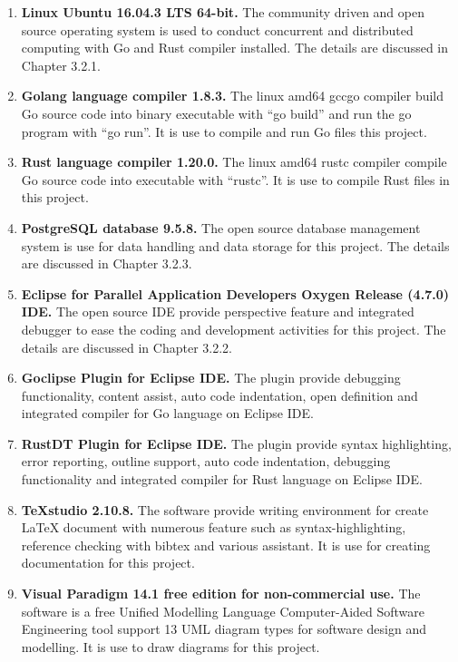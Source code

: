 \begin{enumerate}[topsep=0pt,itemsep=-1ex,partopsep=1ex,parsep=1.5ex]

\item \textbf{Linux Ubuntu 16.04.3 LTS 64-bit.} The community driven and open source operating system is used to conduct concurrent and distributed computing with Go and Rust compiler installed. The details are discussed in Chapter 3.2.1. 

\item \textbf{Golang language compiler 1.8.3.} The linux amd64 gccgo compiler build Go source code into binary executable with “go build” and run the go program with “go run”. It is use to compile and run Go files this project.

\item \textbf{Rust language compiler 1.20.0. } The linux amd64 rustc compiler compile Go source code into executable with “rustc”.  It is use to compile Rust files in this project.

\item \textbf{PostgreSQL database 9.5.8.} The open source database management system is use for data handling and data storage for this project. The details are discussed in Chapter 3.2.3.

\item \textbf{Eclipse for Parallel Application Developers Oxygen Release (4.7.0) IDE.} The open source IDE provide perspective feature and integrated debugger to ease the coding and development activities for this project. The details are discussed in Chapter 3.2.2.

\item \textbf{Goclipse Plugin for Eclipse IDE.} The plugin provide debugging functionality, content assist, auto code indentation, open definition and integrated compiler for Go language on Eclipse IDE. 

\item \textbf{RustDT Plugin for Eclipse IDE.} The plugin provide syntax highlighting, error reporting, outline support, auto code indentation, debugging functionality and integrated compiler for Rust language on Eclipse IDE. 

\item \textbf{TeXstudio 2.10.8. } The software provide writing environment for create LaTeX document with numerous feature such as syntax-highlighting, reference checking with bibtex and various assistant. It is use for creating documentation for this project.
\pagebreak
\item \textbf{Visual Paradigm 14.1 free edition for non-commercial use.} The software is a free Unified Modelling Language Computer-Aided Software Engineering tool support 13 UML diagram types for software design and modelling. It is use to draw diagrams for this project. 

\end{enumerate}


